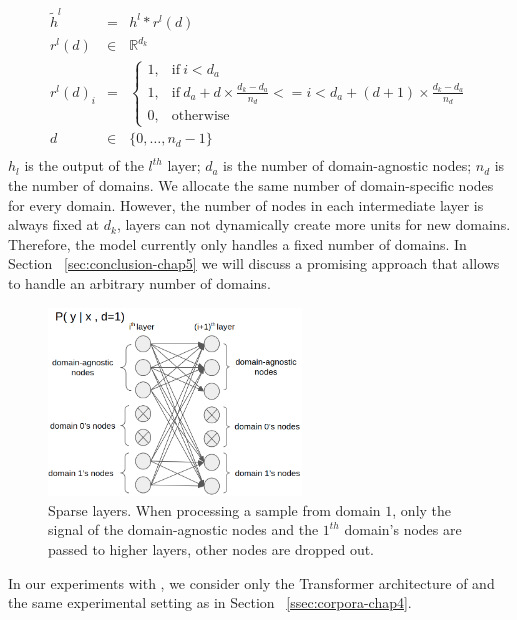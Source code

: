 \begin{equation}
\begin{array}{rcl}
\tilde{h}^{l} &=& h^{l} * r^{l}(d) \\
r^{l}(d) & \in & \mathbb{R}^{d_k} \\
r^{l}(d)_i &=& \begin{cases}
      1, & \text{if}\ i<d_a \\
      1, & \text{if}\ d_a + d \times \frac{d_k - d_a}{n_d} <= i < d_a + (d+1) \times \frac{d_k - d_a}{n_d} \\
      0, & \text{otherwise}
    \end{cases} \\
d & \in & \{0,\dots,n_d-1 \} \\
\end{array}
\label{eq:sparse-chap5}
\end{equation}
$h_l$ is the output of the $l^{th}$ layer; $d_a$ is the number of domain-agnostic nodes; $n_d$ is the number of domains. We allocate the same number of domain-specific nodes for every domain. However, the number of nodes in each intermediate layer is always fixed at $d_k$,  layers can not dynamically create more units for new domains. Therefore, the model currently only handles a fixed number of domains. In Section ~\ref{sec:conclusion-chap5} we will discuss a promising approach that allows  to handle an arbitrary number of domains.

\begin{figure}[h!]
  \center
  \includegraphics[width=0.6\textwidth]{graphics/Sparse_layers}
  \caption{Sparse layers. When processing a sample from domain $1$, only the signal of the domain-agnostic nodes and the $1^{th}$ domain's nodes are passed to higher layers, other nodes are dropped out.} 
  \label{fig:sparse-chap5}
\end{figure}
In our experiments with , we consider only the Transformer architecture of \citet{Vaswani17attention} and the same experimental setting as in Section ~\ref{ssec:corpora-chap4}.

